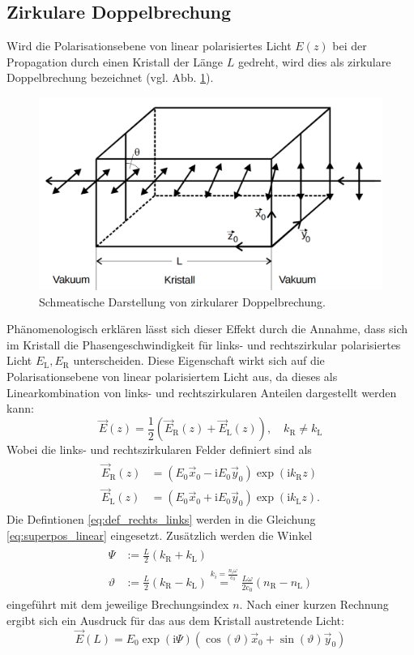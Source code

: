 \subsection{Zirkulare Doppelbrechung}
Wird die Polarisationsebene von linear polarisiertes Licht $E(z)$ bei der Propagation
durch einen Kristall der Länge $L$ gedreht, wird dies als zirkulare Doppelbrechung bezeichnet (vgl. Abb. \ref{fig:zirkulare_doppelbrechung}).
\begin{figure}
\centering
\includegraphics[width=0.5\linewidth]{./content/images/drehung_polarisationsebene.pdf}
\caption{Schmeatische Darstellung von zirkularer Doppelbrechung.}
\label{fig:zirkulare_doppelbrechung}
\end{figure}
Phänomenologisch erklären lässt sich dieser Effekt durch die Annahme, dass sich im
Kristall die Phasengeschwindigkeit für links- und rechtszirkular polarisiertes
Licht $E_\text{L}, E_\text{R}$ unterscheiden.
Diese Eigenschaft wirkt sich auf die Polarisationsebene
von linear polarisiertem Licht aus, da dieses als Linearkombination
von links- und rechtszirkularen Anteilen dargestellt werden kann:
\begin{equation}
  \label{eq:superpos_linear}
\vec{E}(z) = \frac{1}{2}( \vec{E}_\text{R}(z) + \vec{E}_\text{L}(z)), \quad k_\text{R}\neq k_\text{L}
\end{equation}
Wobei die links- und rechtszirkularen Felder definiert sind als
\begin{align}
  \label{eq:def_rechts_links}
  \begin{aligned}
  \vec{E}_\text{R}(z) &= \left(E_0 \vec{x}_0 - \text{i}E_0\vec{y}_0\right)\exp\left(\text{i}{k}_\text{R}z\right)\\
  \vec{E}_\text{L}(z) &= \left(E_0 \vec{x}_0 + \text{i}E_0\vec{y}_0\right)\exp\left(\text{i}{k}_\text{L}z\right).
\end{aligned}
\end{align}
Die Defintionen \eqref{eq:def_rechts_links} werden in die Gleichung \eqref{eq:superpos_linear}
eingesetzt.
Zusätzlich werden die Winkel
\begin{align}
  \label{eq:winkel}
  \begin{aligned}
    \Psi&:=\frac{L}{2}(k_\text{R}+k_\text{L}) \\
    \vartheta &:= \frac{L}{2}(k_\text{R}-k_\text{L}) \overset{k_i=\frac{n_i\omega}{\text{c}_0}}{=} \frac{L\omega}{2\text{c}_0}\left(n_\text{R}-n_\text{L}\right)
\end{aligned}
\end{align}
eingeführt mit dem jeweilige Brechungsindex $n$.
Nach einer kurzen Rechnung ergibt sich ein
Ausdruck für das aus dem Kristall austretende Licht:
\begin{equation*}
  \vec{E}(L)=E_0 \exp(\text{i}\Psi)\left(\cos(\vartheta) \vec{x}_0 + \sin(\vartheta)\vec{y}_0\right)
\end{equation*}

